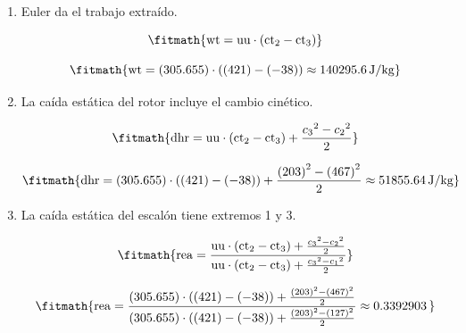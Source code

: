 \begin{enumerate}

\item Euler da el trabajo extraído.

\[\fitmath{\mathrm{wt}=\mathrm{uu}\cdot \left(\mathrm{ct}_{2}-\mathrm{ct}_{3}\right)}\]

\[\fitmath{\mathrm{wt}=(305.655)\cdot \left((421)-(-38)\right)\approx 140295.6\,\mathrm{J/kg}}\]

\item La caída estática del rotor incluye el cambio cinético.

\[\fitmath{\mathrm{dhr}=\mathrm{uu}\cdot \left(\mathrm{ct}_{2}-\mathrm{ct}_{3}\right)+\frac{{c_{3}}^{2}-{c_{2}}^{2}}{2}}\]

\[\fitmath{\mathrm{dhr}=(305.655)\cdot \left((421)-(-38)\right)+\frac{{(203)}^{2}-{(467)}^{2}}{2}\approx 51855.64\,\mathrm{J/kg}}\]

\item La caída estática del escalón tiene extremos 1 y 3.

\[\fitmath{\mathrm{rea}=\frac{\mathrm{uu}\cdot \left(\mathrm{ct}_{2}-\mathrm{ct}_{3}\right)+\frac{{c_{3}}^{2}-{c_{2}}^{2}}{2}}{\mathrm{uu}\cdot \left(\mathrm{ct}_{2}-\mathrm{ct}_{3}\right)+\frac{{c_{3}}^{2}-{c_{1}}^{2}}{2}}}\]

\[\fitmath{\mathrm{rea}=\frac{(305.655)\cdot \left((421)-(-38)\right)+\frac{{(203)}^{2}-{(467)}^{2}}{2}}{(305.655)\cdot \left((421)-(-38)\right)+\frac{{(203)}^{2}-{(127)}^{2}}{2}}\approx 0.3392903\,}\]

\end{enumerate}
